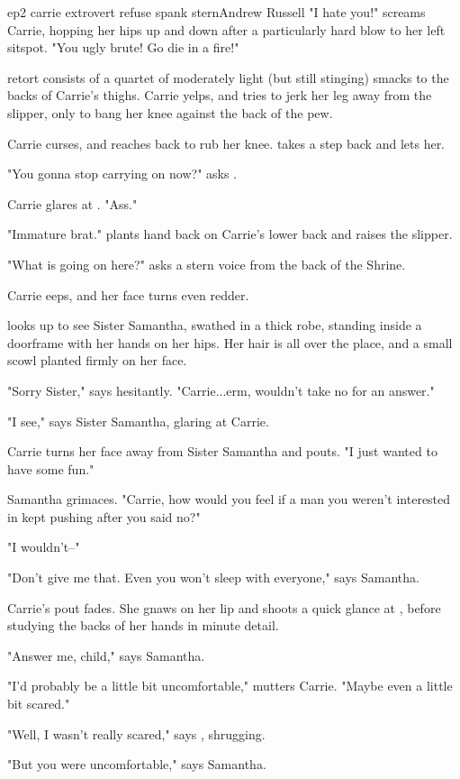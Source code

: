 \documentclass{book}
\begin{document}
\begin{childnode}{ep2 carrie extrovert refuse spank stern}{Andrew Russell}
    "I hate you!" screams Carrie, hopping her hips up and down after a particularly hard blow to her left sitspot. "You ugly brute! Go die in a fire!"

    \names{} retort consists of a quartet of moderately light (but still stinging) smacks to the backs of Carrie's thighs. Carrie yelps, and tries to jerk her leg away from the slipper, only to bang her knee against the back of the pew.

    Carrie curses, and reaches back to rub her knee. \name{} takes a step back and lets her.

    "You gonna stop carrying on now?" asks \name{}.

    Carrie glares at \name{}. "Ass."

    "Immature brat." \name{} plants \hisher{} hand back on Carrie's lower back and raises the slipper.

    "What is going on here?" asks a stern voice from the back of the Shrine.

    Carrie eeps, and her face turns even redder.

    \name{} looks up to see Sister Samantha, swathed in a thick robe, standing inside a doorframe with her hands on her hips. Her hair is all over the place, and a small scowl planted firmly on her face.

    "Sorry Sister," says \name{} hesitantly. "Carrie...erm, wouldn't take no for an answer."

    "I see," says Sister Samantha, glaring at Carrie. 

    Carrie turns her face away from Sister Samantha and pouts. "I just wanted to have some fun."

    Samantha grimaces. "Carrie, how would you feel if a man you weren't interested in kept pushing after you said no?"

    "I wouldn't--"

    "Don't give me that. Even you won't sleep with everyone," says Samantha.

    Carrie's pout fades. She gnaws on her lip and shoots a quick glance at \name{}, before studying the backs of her hands in minute detail.

    "Answer me, child," says Samantha.

    "I'd probably be a little bit uncomfortable," mutters Carrie. "Maybe even a little bit scared."

    "Well, I wasn't really scared," says \name{}, shrugging.

    "But you were uncomfortable," says Samantha.


\end{childnode}
\end{document}
